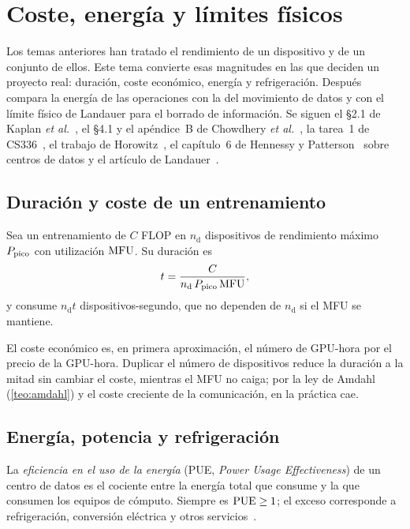 \chapter{Coste, energía y límites físicos}
\label{tema:6}

Los temas anteriores han tratado el rendimiento de un dispositivo y de un conjunto de ellos. Este tema convierte esas magnitudes en las que deciden un proyecto real: duración, coste económico, energía y refrigeración. Después compara la energía de las operaciones con la del movimiento de datos y con el límite físico de Landauer para el borrado de información. Se siguen el §2.1 de Kaplan \emph{et al.}~\cite{kaplan}, el §4.1 y el apéndice~B de Chowdhery \emph{et al.}~\cite{palm}, la tarea~1 de CS336~\cite[§4.3]{cs336a1}, el trabajo de Horowitz~\cite{horowitz}, el capítulo~6 de Hennessy y Patterson~\cite{hp} sobre centros de datos y el artículo de Landauer~\cite{landauer}.

\section{Duración y coste de un entrenamiento}

\begin{proposicion}\label{prop:duracion}
Sea un entrenamiento de $C$ FLOP en $n_{\mathrm{d}}$ dispositivos de rendimiento máximo $P_{\mathrm{pico}}$ con utilización $\mathrm{MFU}$. Su duración es
\[
t=\frac{C}{n_{\mathrm{d}}\,P_{\mathrm{pico}}\,\mathrm{MFU}},
\]
y consume $n_{\mathrm{d}}t$ dispositivos-segundo, que no dependen de $n_{\mathrm{d}}$ si el MFU se mantiene.
\end{proposicion}

El coste económico es, en primera aproximación, el número de GPU-hora por el precio de la GPU-hora. Duplicar el número de dispositivos reduce la duración a la mitad sin cambiar el coste, mientras el MFU no caiga; por la ley de Amdahl (\cref{teo:amdahl}) y el coste creciente de la comunicación, en la práctica cae.

\addtocounter{definicion}{1}%

\section{Energía, potencia y refrigeración}

\begin{definicion}[PUE]
La \emph{eficiencia en el uso de la energía} (PUE, \emph{Power Usage Effectiveness}) de un centro de datos es el cociente entre la energía total que consume y la que consumen los equipos de cómputo. Siempre es $\mathrm{PUE}\ge 1$; el exceso corresponde a refrigeración, conversión eléctrica y otros servicios~\cite[cap.~6]{hp}.
\end{definicion}

